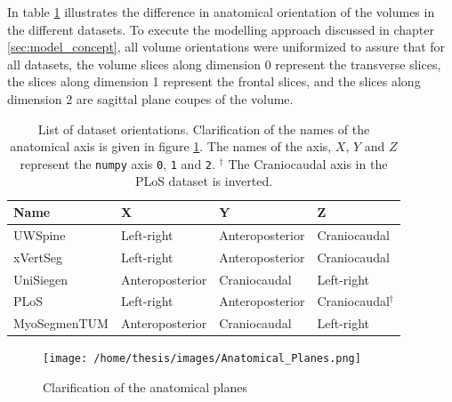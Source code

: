 In table \ref{tab:dataOrientation} illustrates the difference in anatomical orientation of the volumes in the different datasets.
To execute the modelling approach discussed in chapter \ref{sec:model_concept}, all volume orientations were uniformized to assure that for all datasets, the volume slices along dimension 0 represent the transverse slices, 
the slices along dimension 1 represent the frontal slices, and the slices along dimension 2 are sagittal plane coupes of the volume.

\begin{table}
 
    \begin{tabular}{ l l l l} 
     \toprule
     Name & X & Y & Z \\
     \hline 
    UWSpine & Left-right & Anteroposterior & Craniocaudal \\
    xVertSeg & Left-right & Anteroposterior & Craniocaudal \\
    UniSiegen  &  Anteroposterior & Craniocaudal & Left-right \\
    PLoS & Left-right & Anteroposterior & Craniocaudal$^\dagger$ \\
    MyoSegmenTUM &  Anteroposterior & Craniocaudal & Left-right \\
     \bottomrule
    \end{tabular}
    \caption{List of dataset orientations. Clarification of the names of the anatomical axis is given in figure \ref{fig:anatomicalPlains}.
    The names of the axis, $X$, $Y$ and $Z$ represent the \texttt{numpy} axis \texttt{0}, \texttt{1} and \texttt{2}.
    $^\dagger$ The Craniocaudal axis in the PLoS dataset is inverted.\label{tab:dataOrientation}}

\end{table}

\begin{figure}
    \centering
    \texttt{[image: /home/thesis/images/Anatomical\_Planes.png]}
    \caption{Clarification of the anatomical planes\label{fig:anatomicalPlains}}
  \end{figure}

